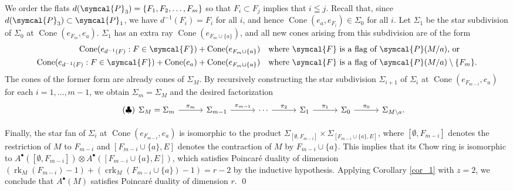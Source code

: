 \documentclass[a4paper,final,oneside]{amsart}
\theoremstyle{definition}
\theoremstyle{plain}
\theoremstyle{remark}
\DeclareMathOperator{\Cone}{Cone}
\DeclareMathOperator{\rk}{rk}
\DeclareMathOperator{\crk}{crk}
\begin{document}
We order the flats \(d(\symcal{P}_3)=\{F_1, F_2,\dotsc, F_m\}\) so that \(F_i\subset F_j\) implies that \(i \leqq j\).
Recall that, since \(d(\symcal{P}_3)\subset \symcal{P}_1\), we have \(d^{-1}(F_i)=F_i\) for all \(i\), and hence \(\Cone(e_a,e_{F_i})\in \Sigma_0\) for all \(i\).
Let \(\Sigma_1\) be the star subdivision of \(\Sigma_0\) at \(\Cone(e_{F_m},e_a)\).
\(\Sigma_1\) has an extra ray \(\Cone(e_{F_{m}\cup\{a\}})\), and all new cones arising from this subdivision are of the form
\begin{align}
\Cone (e_{d^{-1}(F)}: F \in \symcal{F})+\Cone (e_{F_m\cup\{a\}}) &\quad \text{where \(\symcal{F}\) is a flag of \(\symcal{P}(M/a)\), or}\\
\Cone (e_{d^{-1}(F)}: F \in \symcal{F})+\Cone(e_a)+\Cone (e_{F_m\cup\{a\}}) &\quad \text{where \(\symcal{F}\) is a flag of \(\symcal{P}(M/a)\setminus\{F_m\}\).}
\end{align}
The cones of the former form are already cones of \(\Sigma_M\).
By recursively constructing the star subdivision \(\Sigma_{i+1}\) of \(\Sigma_i\) at \(\Cone(e_{F_{m-i}},e_a)\) for each \(i=1,\dotsc,m-1\), we obtain \(\Sigma_{m}=\Sigma_M\) and the desired factorization 
\begin{equation}\tag{$\clubsuit$}
\begin{tikzcd}[column sep =3em]
\Sigma_M = \Sigma_{m} \arrow[r,"\pi_{m}"] & \Sigma_{m-1} \arrow[r,"\pi_{m-1}"]& \cdots \arrow[r,"\pi_{2}"]& \Sigma_{1} \arrow[r,"\pi_{1}"]& \Sigma_0 \arrow[r,"\pi_0"]& \Sigma_{M\backslash a}.
\end{tikzcd}
\end{equation}

Finally, the star fan of \(\Sigma_i\) at \(\Cone(e_{F_{m-i}},e_a)\) is isomorphic to the product \(\Sigma_{[\emptyset,F_{m-i}]}\times \Sigma_{[F_{m-i}\cup\{a\},E]}\), where \([\emptyset,F_{m-i}]\) denotes the restriction of \(M\) to \(F_{m-i}\) and \([F_{m-i}\cup\{a\},E]\) denotes the contraction of \(M\) by \(F_{m-i}\cup\{a\}\).
This implies that its Chow ring is isomorphic to \(A^{\bullet}([\emptyset,F_{m-i}])\otimes A^{\bullet}([F_{m-i}\cup\{a\},E])\), which satisfies Poincar\'e duality of dimension \((\rk_M(F_{m-i})-1)+(\crk_M(F_{m-i}\cup\{a\})-1)=r-2\) by the inductive hypothesis.
Applying Corollary \ref{cor_1} with \(z=2\), we conclude that \(A^{\bullet}(M)\) satisfies Poincar\'e duality of dimension \(r\).
\qed
\clearpage
\end{document}
